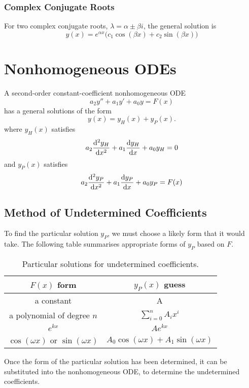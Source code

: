 \documentclass{article}
\begin{document}
\subsubsection{Complex Conjugate Roots}
For two complex conjugate roots, \(\lambda = \alpha \pm \beta i\), the general solution is
\begin{equation*}
    y(x) = e^{\alpha x}\bigl( c_1\cos{\left( \beta x \right)} + c_2 \sin{\left( \beta x \right)} \bigr)
\end{equation*}
\section{Nonhomogeneous ODEs}
A second-order constant-coefficient nonhomogeneous ODE
\begin{equation*}
    a_2y'' + a_1y' + a_0y = F(x)
\end{equation*}
has a general solutions of the form
\begin{equation*}
    y(x) = y_H(x) + y_P(x).
\end{equation*}
where \(y_H(x)\) satisfies
\begin{equation*}
    a_2\dv[2]{y_H}{x} + a_1\dv{y_H}{x} + a_0y_H = 0
\end{equation*}
and \(y_P(x)\) satisfies
\begin{equation*}
    a_2\dv[2]{y_P}{x} + a_1\dv{y_P}{x} + a_0y_P = F(x)
\end{equation*}
\subsection{Method of Undetermined Coefficients}
To find the particular solution \(y_P\), we must choose a likely
form that it would take. The following table summarises appropriate
forms of \(y_P\) based on \(F\).
\begin{table}[H]
    \centering
    \begin{tabular}{c c}
        \toprule
        \(F(x)\) form                                                          & \(y_P(x)\) guess                                                          \\
        \midrule
        a constant                                                             & A                                                                         \\
        a polynomial of degree \(n\)                                           & \(\displaystyle \sum_{i = 0}^n A_i x^i\)                                  \\
        \(e^{kx}\)                                                            & \(A e^{kx}\)                                                             \\
        \(\cos{\left( \omega x \right)}\) or \(\sin{\left( \omega x \right)}\) & \(A_0 \cos{\left( \omega x \right)} + A_1 \sin{\left( \omega x \right)}\) \\
        \bottomrule
    \end{tabular}
    \caption{Particular solutions for undetermined coefficients.}
\end{table}
Once the form of the particular solution has been determined, it can be substituted into the
nonhomogeneous ODE, to determine the undetermined coefficients.
\end{document}
